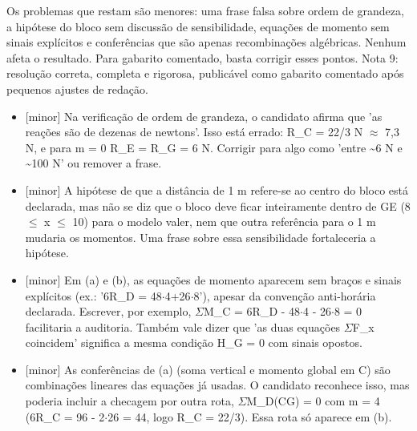 \documentclass{article}%
\begin{document}
\newline%
Os problemas que restam são menores: uma frase falsa sobre ordem de grandeza, a hipótese do bloco sem discussão de sensibilidade, equações de momento sem sinais explícitos e conferências que são apenas recombinações algébricas. Nenhum afeta o resultado. Para gabarito comentado, basta corrigir esses pontos.\newline%
\newline%
Nota 9: resolução correta, completa e rigorosa, publicável como gabarito comentado após pequenos ajustes de redação.%
\begin{itemize}%
\item%
{[}minor{]} Na verificação de ordem de grandeza, o candidato afirma que 'as reações são de dezenas de newtons'. Isso está errado: R\_C = 22/3 N $\approx$ 7,3 N, e para m = 0 R\_E = R\_G = 6 N. Corrigir para algo como 'entre \textasciitilde{}6 N e \textasciitilde{}100 N' ou remover a frase.%
\item%
{[}minor{]} A hipótese de que a distância de 1 m refere{-}se ao centro do bloco está declarada, mas não se diz que o bloco deve ficar inteiramente dentro de GE (8 $\leq$ x $\leq$ 10) para o modelo valer, nem que outra referência para o 1 m mudaria os momentos. Uma frase sobre essa sensibilidade fortaleceria a hipótese.%
\item%
{[}minor{]} Em (a) e (b), as equações de momento aparecem sem braços e sinais explícitos (ex.: '6R\_D = 48$\cdot$4+26$\cdot$8'), apesar da convenção anti{-}horária declarada. Escrever, por exemplo, $\Sigma$M\_C = 6R\_D - 48$\cdot$4 - 26$\cdot$8 = 0 facilitaria a auditoria. Também vale dizer que 'as duas equações $\Sigma$F\_x coincidem' significa a mesma condição H\_G = 0 com sinais opostos.%
\item%
{[}minor{]} As conferências de (a) (soma vertical e momento global em C) são combinações lineares das equações já usadas. O candidato reconhece isso, mas poderia incluir a checagem por outra rota, $\Sigma$M\_D(CG) = 0 com m = 4 (6R\_C = 96 - 2$\cdot$26 = 44, logo R\_C = 22/3). Essa rota só aparece em (b).%
\end{itemize}%
\end{document}

